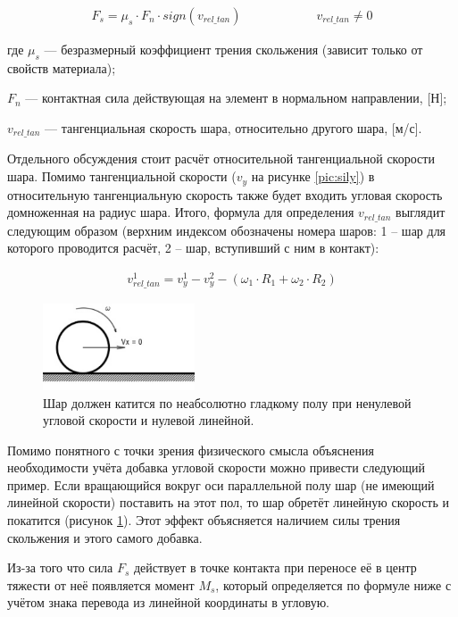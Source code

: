 \documentclass[a4paper]{article}
\begin{document}
\begin{align}
\label{sliding_force}
F_s = \mu_s \cdot F_n \cdot sign(v_{rel\_tan}) \qquad \qquad \qquad v_{rel\_tan} \neq 0
\end{align}

где $\mu_s$ --- безразмерный коэффициент трения скольжения (зависит только от свойств материала);

$F_n$ --- контактная сила действующая на элемент в нормальном направлении, [Н];

$v_{rel\_tan}$ --- тангенциальная скорость шара, относительно другого шара, [м/с].


Отдельного обсуждения стоит расчёт относительной тангенциальной скорости шара. 
Помимо тангенциальной скорости ($v_y$ на рисунке \ref{pic:sily}) в относительную тангенциальную скорость также будет входить угловая скорость домноженная на радиус шара.
Итого, формула для определения $v_{rel\_tan}$ выглядит следующим образом (верхним индексом обозначены номера шаров: 1 -- шар для которого проводится расчёт, 2 -- шар, вступивший с ним в контакт):

\begin{align}
\label{rel_tan_velocity}
v_{rel\_tan}^{1} = v_{y}^{1} - v_{y}^{2} - \left( \omega_1 \cdot R_1 + \omega_2 \cdot R_2 \right)
\end{align}

\begin{figure}[h!]
	\centering
	\label{pic:pol_omega}
	\includegraphics[width=0.4\textwidth]{pol_omega}
	\caption{Шар должен катится по неабсолютно гладкому полу при ненулевой угловой скорости и нулевой линейной.}
\end{figure} 

Помимо понятного с точки зрения физического смысла объяснения необходимости учёта добавка угловой скорости можно привести следующий пример. 
Если вращающийся вокруг оси параллельной полу шар (не имеющий линейной скорости) поставить на этот пол, то шар обретёт линейную скорость и покатится (рисунок \ref{pic:pol_omega}). 
Этот эффект объясняется наличием силы трения скольжения и этого самого добавка.

Из-за того что сила $F_s$ действует в точке контакта при переносе её в центр тяжести от неё появляется момент $M_s$, который определяется по формуле ниже с учётом знака перевода из линейной координаты в угловую.
\end{document}
